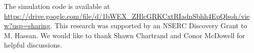 \documentclass[draft]{agujournal2018}
\begin{document}
\acknowledgments
The simulation code is available at
\sloppy
\url{https://drive.google.com/file/d/1bWEX_ZHlcGRKCxtRIadnSbhh4EpQlsoh/view?usp=sharing}.
This research was supported by an NSERC Discovery Grant to M. Hassan.
We would like to thank Shawn Chartrand and Conor McDowell for helpful discussions.


\end{document}
